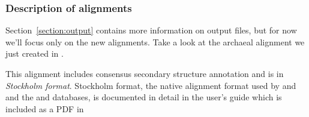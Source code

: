 \subsubsection{Description of alignments}

Section~\ref{section:output} contains more information
on  output files, but for now we'll focus only on the new
alignments.  Take a look at the archaeal alignment we just created in
.

This alignment includes consensus secondary structure annotation and
is in \emph{Stockholm format}. 
Stockholm format, the native alignment format used by  and
 and the  and 
databases, is documented in detail in the  user's
guide which is included as a PDF in 

